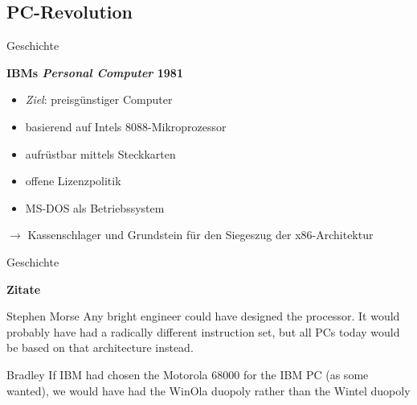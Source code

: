 \subsection{PC-Revolution}
\begin{frame}{Geschichte}
    \begin{center}
        \textbf{IBMs \textit{Personal Computer} 1981}
    \end{center}

    \begin{itemize}
        \item \emph{Ziel}: preisgünstiger Computer
        \item basierend auf Intels 8088-Mikroprozessor
        \item aufrüstbar mittels Steckkarten
        \item offene Lizenzpolitik
        \item MS-DOS als Betriebssystem
    \end{itemize}

    $\rightarrow$ Kassenschlager und Grundstein für den Siegeszug der x86-Architektur
\end{frame}

\begin{frame}{Geschichte}
    \begin{center}
        \textbf{Zitate}
    \end{center}

    \begin{block}{Stephen Morse}
        Any bright engineer could have designed the processor. It would probably have had a radically different instruction set, but all PCs today would be based on that architecture instead.
    \end{block}

    \pause

    \begin{block}{Bradley}
        If IBM had chosen the Motorola 68000 for the IBM PC (as some wanted), we would have had the WinOla duopoly rather than the Wintel duopoly
    \end{block}
\end{frame}
